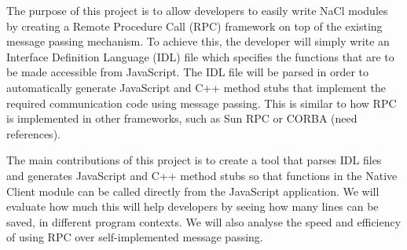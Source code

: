 The purpose of this project is to allow developers to easily write NaCl modules 
by creating a Remote Procedure Call (RPC) framework on top of the existing 
message passing mechanism. To achieve this, the developer will simply write an 
Interface Definition Language (IDL) file which specifies the functions that are 
to be made accessible from JavaScript. The IDL file will be parsed in order to 
automatically generate JavaScript and C++ method stubs that implement the 
required communication code using message passing. This is similar to how RPC 
is implemented in other frameworks, such as Sun RPC or CORBA (need references).

The main contributions of this project is to create a tool that parses IDL files 
and generates JavaScript and C++ method stubs so that functions in the Native 
Client module can be called directly from the JavaScript application. We will 
evaluate how much this will help developers by seeing how many lines can be 
saved, in different program contexts. We will also analyse the speed and 
efficiency of using RPC over self-implemented message passing. 